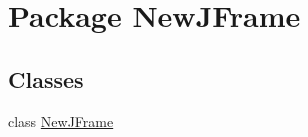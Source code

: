 \hypertarget{namespace_new_j_frame}{\section{\-Package \-New\-J\-Frame}
\label{namespace_new_j_frame}
}
\subsection*{\-Classes}
\begin{DoxyCompactItemize}
\item 
class \hyperlink{class_new_j_frame_1_1_new_j_frame}{\-New\-J\-Frame}
\end{DoxyCompactItemize}

